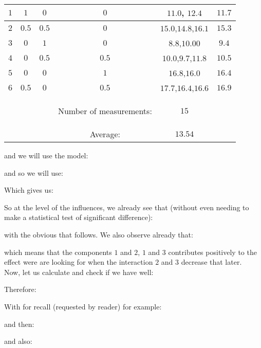 \begin{tcolorbox}[colframe=black,colback=white,sharp corners]
\begin{table}[H]
\begin{tabular}{|c|c|c|c|c|c|}
		       	$1$  &   $1$    &   $0$   & $0$ & $11.0$, $12.4$ & $11.7$  \\ \hline
				$2$  &   $0.5$  & $0.5$   & $0$ & $15.0$,$14.8$,$16.1$ & $15.3$ \\ \hline
		        $3$  &   $0$    &   $1$   & $0$ & $8.8$,$10.00$ & $9.4$ \\ \hline
		        $4$  &   $0$    &   $0.5$ & $0.5$ & $10.0$,$9.7$,$11.8$ & $10.5$ \\ \hline
		        $5$  &   $0$    &   $0$   & $1$ & $16.8$,$16.0$ & $16.4$  \\ \hline
		        $6$  &   $0.5$  & $0$   &   $0.5$ & $17.7$,$16.4$,$16.6$ & $16.9$  \\ \hline
		        \hhline{|=|=|=|=|=|=|}
		        &  & & \parbox{2.2cm}{\begin{flushleft}
		          { {\footnotesize Number of measurements:}}\end{flushleft}} & $15$ &  \\ \hline
				&  &  &  {\footnotesize  Average:} & $13.54$ &   \\ \hline
		\end{tabular}
	\end{table}
	and we will use the model:
	
 	and so we will use:
	
 	Which gives us:
	\end{tcolorbox}
	
	\begin{tcolorbox}[colframe=black,colback=white,sharp corners]
	
	So at the level of the influences, we already see that (without even needing to make a statistical test of significant difference):
	
	with the obvious that follows. We also observe already that:
	
	which means that the components $1$ and $2$, $1$ and $3$ contributes positively to the effect were are looking for when the interaction $2$ and $3$ decrease that later.\\

	Now, let us calculate and check if we have well:
	
	Therefore:
	
	With for recall (requested by reader) for example:
	
	and then:
	
	and also:
	\end{tcolorbox}
	
